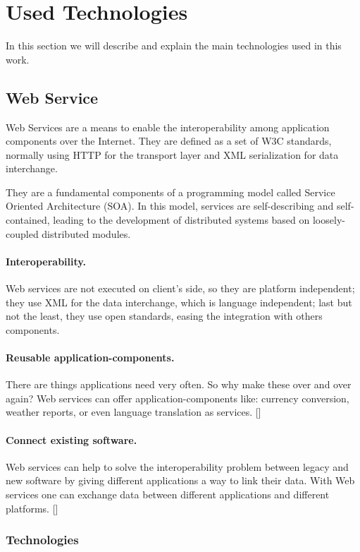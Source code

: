 \section{Used Technologies}
\label{used-technologies}
In this section we will describe and explain the main technologies used in this work.

\subsection{Web Service}
Web Services are a means to enable the interoperability among application components over the Internet.  They are defined as a set of W3C standards, normally using HTTP for the transport layer and XML serialization for data interchange.

They are  a fundamental components of a programming model called Service Oriented Architecture (SOA). In this model, services are self-describing and self-contained, leading to the development of distributed systems based on loosely-coupled distributed modules.

\paragraph{Interoperability.}
Web services are not executed on client's side, so they are platform independent; they use XML for the data interchange, which is language independent; last but not the least, they use open standards, easing the integration with others components.

\paragraph{Reusable application-components.}
There are things applications need very often. So why make these over and over again? Web services can offer application-components like: currency conversion, weather reports, or even language translation as services.  [\citet{WST}]

\paragraph{Connect existing software.}
Web services can help to solve the interoperability problem between legacy and new software by giving different applications a way to link their data. With Web services one can exchange data between different applications and different platforms. [\citet{WST}]

\subsubsection{Technologies}

